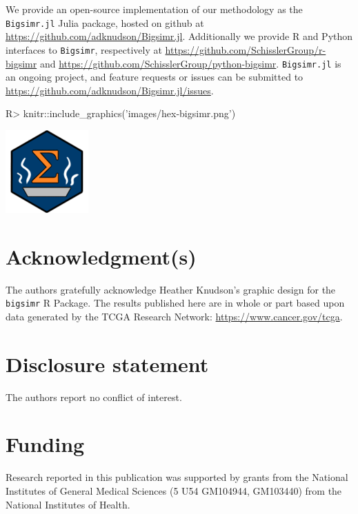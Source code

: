 \documentclass[
]{jss}
\begin{document}
We provide an open-source implementation of our methodology as the \texttt{Bigsimr.jl} Julia package, hosted on github at \url{https://github.com/adknudson/Bigsimr.jl}. Additionally we provide R and Python interfaces to \texttt{Bigsimr}, respectively at \url{https://github.com/SchisslerGroup/r-bigsimr} and \url{https://github.com/SchisslerGroup/python-bigsimr}. \texttt{Bigsimr.jl} is an ongoing project, and feature requests or issues can be submitted to \url{https://github.com/adknudson/Bigsimr.jl/issues}.

\begin{CodeChunk}
\begin{CodeInput}
R> knitr::include_graphics('images/hex-bigsimr.png')
\end{CodeInput}


\begin{center}\includegraphics[width=0.05\linewidth]{images/hex-bigsimr} \end{center}

\end{CodeChunk}

\hypertarget{acknowledgments}{%
\section*{Acknowledgment(s)}\label{acknowledgments}}

The authors gratefully acknowledge Heather Knudson's graphic design for the \texttt{bigsimr} R Package. The results published here are in whole or part based upon data generated by the TCGA Research Network: \url{https://www.cancer.gov/tcga}.

\hypertarget{coi}{%
\section*{Disclosure statement}\label{coi}}

The authors report no conflict of interest.

\hypertarget{funding}{%
\section*{Funding}\label{funding}}

Research reported in this publication was supported by grants from the National Institutes of General Medical Sciences (5 U54 GM104944, GM103440) from the National Institutes of Health.
\end{document}
